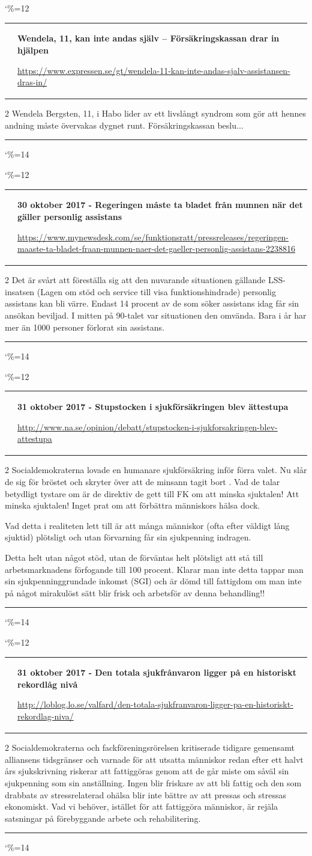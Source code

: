 \documentclass[a4paper]{article}
\makeatletter
\newcommand{\entry}{
\catcode`\%=12
\@entry}
\newcommand{\@entry}[4][]{
\bigskip
\begin{tabular*}{\textwidth}{l m{\textwidth-4cm}}
\qrcode{#4} & \textbf{#2}

\medskip

\url{#4}

\end{tabular*}

\medskip


\begin{multicols}{2}
#3
\end{multicols}

#1

\medskip
\hrule

\catcode`\%=14
}
\makeatother
\begin{document}
{{{{\entry{Wendela, 11, kan inte andas själv – Försäkringskassan drar in hjälpen}{Wendela Bergsten, 11, i Habo lider av ett livslångt syndrom som gör att hennes andning måste övervakas dygnet runt. Försäkringskassan beslu...}
{https://www.expressen.se/gt/wendela-11-kan-inte-andas-sjalv-assistansen-dras-in/}


\entry{30 oktober 2017 - Regeringen måste ta bladet från munnen när det gäller personlig assistans}{Det är svårt att föreställa sig att den nuvarande situationen gällande LSS-insatsen (Lagen om stöd och service till visa funktionshindrade) personlig assistans kan bli värre. Endast 14 procent av de som söker assistans idag får sin ansökan beviljad. I mitten på 90-talet var situationen den omvända. Bara i år har mer än 1000 personer förlorat sin assistans.}{https://www.mynewsdesk.com/se/funktionsratt/pressreleases/regeringen-maaste-ta-bladet-fraan-munnen-naer-det-gaeller-personlig-assistans-2238816}

\entry{31 oktober 2017 - Stupstocken i sjukförsäkringen blev ättestupa}{Socialdemokraterna lovade en humanare sjukförsäkring inför förra valet. Nu slår de sig för bröstet och skryter över att de minsann tagit bort \say{stupstocken}. Vad de talar betydligt tystare om är de direktiv de gett till FK om att minska sjuktalen! Att minska sjuktalen! Inget prat om att förbättra människors hälsa dock.

Vad detta i realiteten lett till är att många människor (ofta efter väldigt lång sjuktid) plötsligt och utan förvarning får sin sjukpenning indragen.

Detta helt utan något stöd, utan de förväntas helt plötsligt att stå till arbetsmarknadens förfogande till 100 procent. Klarar man inte detta tappar man sin sjukpenninggrundade inkomst (SGI) och är dömd till fattigdom om man inte på något mirakulöst sätt blir frisk och arbetsför av denna behandling!!
}{http://www.na.se/opinion/debatt/stupstocken-i-sjukforsakringen-blev-attestupa}

\entry{31 oktober 2017 - Den totala sjukfrånvaron ligger på en historiskt rekordlåg nivå}{Socialdemokraterna och fackföreningsrörelsen kritiserade tidigare gemensamt alliansens tidsgränser och varnade för att utsatta människor redan efter ett halvt års sjukskrivning riskerar att fattiggöras genom att de går miste om såväl sin sjukpenning som sin anställning. Ingen blir friskare av att bli fattig och den som drabbats av stressrelaterad ohälsa blir inte bättre av att pressas och stressas ekonomiskt. Vad vi behöver, istället för att fattiggöra människor, är rejäla satsningar på förebyggande arbete och rehabilitering.}{http://loblog.lo.se/valfard/den-totala-sjukfranvaron-ligger-pa-en-historiskt-rekordlag-niva/}

}}}}
\end{document}
